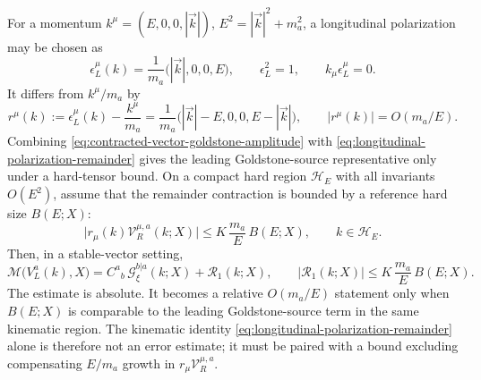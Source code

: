 \begin{controlledapproximation}
For a momentum \(k^\mu=(E,0,0,|\vec k|)\), \(E^2=|\vec k|^2+m_a^2\), a
longitudinal polarization may be chosen as
\begin{equation}
  \epsilon_L^\mu(k)
  =
  \frac{1}{m_a}\bigl(|\vec k|,0,0,E\bigr),
  \qquad
  \epsilon_L^2=1,\qquad k_\mu\epsilon_L^\mu=0 .
  \label{eq:longitudinal-polarization-vector}
\end{equation}
It differs from \(k^\mu/m_a\) by
\begin{equation}
  r^\mu(k)
  :=
  \epsilon_L^\mu(k)-\frac{k^\mu}{m_a}
  =
  \frac{1}{m_a}\bigl(|\vec k|-E,0,0,E-|\vec k|\bigr),
  \qquad
  |r^\mu(k)|=O(m_a/E).
  \label{eq:longitudinal-polarization-remainder}
\end{equation}
Combining \eqref{eq:contracted-vector-goldstone-amplitude} with
\eqref{eq:longitudinal-polarization-remainder} gives the leading
Goldstone-source representative only under a hard-tensor bound.  On a compact
hard region \(\mathcal H_E\) with all invariants \(O(E^2)\), assume that the
remainder contraction is bounded by a reference hard size \(B(E;X)\):
\begin{equation}
  \bigl|r_\mu(k)\mathcal V_R^{\mu,a}(k;X)\bigr|
  \le
  K\,\frac{m_a}{E}\,B(E;X),
  \qquad k\in\mathcal H_E .
  \label{eq:goldstone-equivalence-one-leg-bound}
\end{equation}
Then, in a stable-vector setting,
\begin{equation}
  \mathcal M\bigl(V_L^a(k),X\bigr)
  =
  C^a{}_{b}\,\mathcal G_\xi^{b|a}(k;X)
  +
  \mathcal R_1(k;X),
  \qquad
  |\mathcal R_1(k;X)|
  \le
  K\,\frac{m_a}{E}\,B(E;X).
  \label{eq:longitudinal-goldstone-equivalence-one-leg}
\end{equation}
The estimate is absolute.  It becomes a relative \(O(m_a/E)\) statement only
when \(B(E;X)\) is comparable to the leading Goldstone-source term in the same
kinematic region.  The kinematic identity
\eqref{eq:longitudinal-polarization-remainder} alone is therefore not an error
estimate; it must be paired with a bound excluding compensating \(E/m_a\)
growth in \(r_\mu\mathcal V_R^{\mu,a}\).


\end{controlledapproximation}
